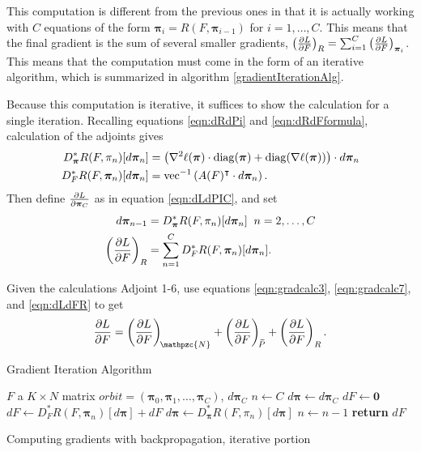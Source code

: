 \begin{calc}[Adjoint \#6]
	This computation is different from the previous ones in that it is actually working with \( C \) equations of the form \( \bm\pi_i = R(F,\bm\pi_{i-1}) \) for \( i=1,\ldots,C \).  This means that the final gradient is the sum of several smaller gradients, \( \left(\pdv{L}{F}\right)_{R} = \sum_{i=1}^{C}\left(\pdv{L}{F}\right)_{\bm\pi_i}\).  This means that the computation must come in the form of an iterative algorithm, which is summarized in algorithm \ref{gradientIterationAlg}.
	
	Because this computation is iterative, it suffices to show the calculation for a single iteration. Recalling equations \eqref{eqn:dRdPi} and \eqref{eqn:dRdFformula}, calculation of the adjoints gives
	\begin{align}
		D_{\bm\pi}^{\ast}R(F,\pi_n)[d\bm\pi_n] &= \left(\nabla^2\ell(\bm\pi)\cdot\operatorname{diag}(\bm\pi) +\operatorname{diag}(\nabla\ell(\bm\pi))\right)\cdot d\bm\pi_n \label{eqn:dRdPiAdj}\\
		D_F^{\ast}R(F,\bm\pi_n)[d\bm\pi_n] &= \operatorname{vec}^{-1}\left(A(F)^{\intercal}\cdot d\bm\pi_n\right). \label{eqn:dRdFAdj}
	\end{align}
	Then define \( \pdv{L}{\bm\pi_C} \) as in equation \eqref{eqn:dLdPIC}, and set
	\begin{align}
		d\bm\pi_{n-1} &=D_{\bm\pi}^{\ast}R(F,\pi_n)[d\bm\pi_n]\;\; n=2,\ldots,C\\
		\left(\pdv{L}{F}\right)_R &= \sum_{n=1}^{C} D_F^{\ast}R(F,\bm\pi_n)[d\bm\pi_n].\label{eqn:dLdFR}
	\end{align}
\end{calc}
Given the calculations Adjoint 1-6, use equations \eqref{eqn:gradcalc3}, \eqref{eqn:gradcalc7}, and \eqref{eqn:dLdFR} to get
\begin{equation}\label{eqn:dLdF}
\pdv{L}{F} = \left(\pdv{L}{F}\right)_{\!\mathpzc{N}} + 	\left(\pdv{L}{F}\right)_{\overbar{\!P}} + \left(\pdv{L}{F}\right)_R.
\end{equation}

\begin{table}
	
	\begin{algorithm}[H]
		\caption{Gradient Iteration Algorithm}\label{gradientIterationAlg}
		\begin{algorithmic}
			\Require $F$ a $K\times N$ matrix
			\Require $orbit = (\bm\pi_0,\bm\pi_1,\ldots,\bm\pi_C)$, $d\bm\pi_C$
			\State $n \gets C$
			\State $d\bm\pi \gets d\bm\pi_C$
			\State $dF \gets \bm 0$
			\State $dF \gets D_F^{\ast}R(F,\bm\pi_n)[d\bm\pi]+dF$ 
			\State $d\bm\pi \gets D_{\bm\pi}^{\ast}R(F,\pi_n)[d\bm\pi]$
			\State $n\gets n-1$
			\EndWhile
			\State \textbf{return} $dF$ 
			\EndProcedure
		\end{algorithmic}
	\end{algorithm}
	\caption{Computing gradients with backpropagation, iterative portion}
\end{table}

